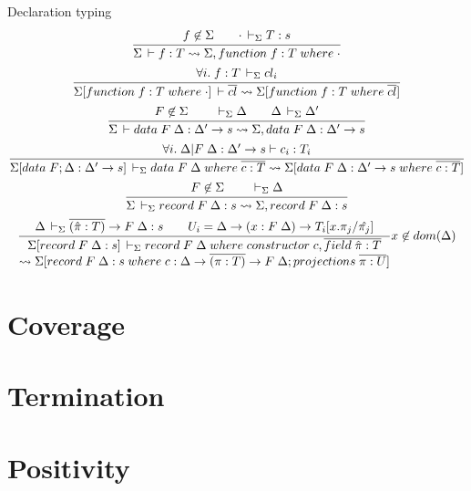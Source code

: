 \documentclass[acmlarge]{acmart}\settopmatter{}
\renewcommand{\|}{\mid}
\begin{document}
Declaration typing 
\begin{gather*}
\ru{f \not\in \Sigma \qquad \cdot \ders T : s}
   {\Sigma \der f : T \leadsto \Sigma, function\; f : T\; where\; \cdot}
\\
\ru{\forall i.\; f : T \ders cl_i}
   {\Sigma[function\; f : T\; where\; \cdot] \der \overline{cl} \leadsto \Sigma[function\; f : T\; where\; \overline{cl}]}
\\
\ru{F \not\in \Sigma \qquad \ders \Delta \qquad \Delta \ders \Delta'}
   {\Sigma \der data\; F\; \Delta : \Delta' \rightarrow s \leadsto \Sigma, data\; F\; \Delta : \Delta' \rightarrow s}
\\
\ru{\forall i.\; \Delta | F\; \Delta : \Delta' \rightarrow s \vdash c_i : T_i}
   {\Sigma[data\; F; \Delta : \Delta' \rightarrow s] \ders data\; F\; \Delta\; where\; \overline{c : T} \leadsto \Sigma[data\; F\; \Delta : \Delta' \rightarrow s\; where\; \overline{c : T}]}
\\
\ru{F \not\in \Sigma \qquad \ders \Delta}
   {\Sigma \ders record\; F \; \Delta : s \leadsto \Sigma, record\; F\; \Delta : s}
\\
\ru{\Delta \ders \overline{(\hat{\pi} : T)} \rightarrow F\; \Delta : s \qquad
    U_i = \Delta \rightarrow (x : F\; \Delta) \rightarrow T_i[x.\pi_j / \hat{\pi_j}] }
   {\Sigma[record\; F\; \Delta : s] \ders record\; F\; \Delta\; where\; constructor\; c, \overline{field\; \hat{\pi} : T} \\  \leadsto \Sigma[record\; F\; \Delta : s\; where\; c : \Delta \rightarrow \overline{(\pi : T)} \rightarrow F\; \Delta; projections\; \overline{\pi : U}]} x \not\in dom(\Delta)
\end{gather*}







\section{Coverage}
\label{sec:coverage}

\section{Termination}
\label{sec:termination}

\section{Positivity}
\label{sec:positivity}
\end{document}
